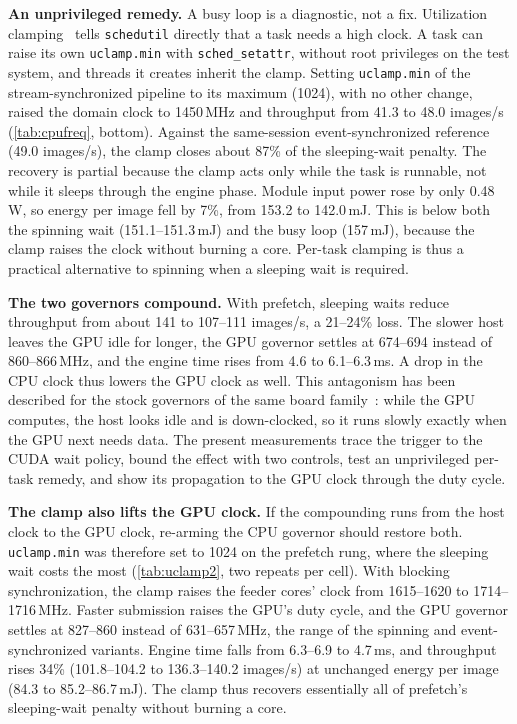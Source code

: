 

\textbf{An unprivileged remedy.}
A busy loop is a diagnostic, not a fix. Utilization
clamping~\cite{linux2024uclamp} tells \texttt{schedutil} directly that a
task needs a high clock. A task can raise its own \texttt{uclamp.min}
with \texttt{sched\_setattr}, without root privileges on the test
system, and threads it creates inherit the clamp. Setting
\texttt{uclamp.min} of the stream-synchronized pipeline to its maximum
(1024), with no other change, raised the domain clock to 1450\,MHz and
throughput from 41.3 to 48.0 images/s (\cref{tab:cpufreq}, bottom). Against
the same-session event-synchronized reference (49.0 images/s), the clamp
closes about 87\% of the sleeping-wait penalty. The recovery is partial
because the clamp acts only while the task is runnable, not while it
sleeps through the engine phase. Module input
power rose by only 0.48\,W, so energy per image fell by 7\%, from 153.2
to 142.0\,mJ. This is below both the spinning wait (151.1--151.3\,mJ)
and the busy loop (157\,mJ), because the clamp raises the clock without
burning a core. Per-task clamping is thus a practical alternative
to spinning when a sleeping wait is required.

\textbf{The two governors compound.}
With prefetch, sleeping waits reduce throughput from about 141 to
107--111 images/s, a 21--24\% loss. The slower host leaves the GPU idle
for longer, the GPU governor settles at 674--694 instead of
860--866\,MHz, and the engine time rises from 4.6 to 6.1--6.3\,ms. A
drop in the CPU clock thus lowers the GPU clock as well. This
antagonism has been described for the stock governors of the same board
family~\cite{zhang2026sparsedvfs}: while the GPU computes, the host
looks idle and is down-clocked, so it runs slowly exactly when the GPU
next needs data. The present measurements trace the trigger to the CUDA
wait policy, bound the effect with two controls, test an unprivileged
per-task remedy, and show its propagation to the GPU clock through the
duty cycle.

\textbf{The clamp also lifts the GPU clock.}
If the compounding runs from the host clock to the GPU clock,
re-arming the CPU governor should restore both. \texttt{uclamp.min} was
therefore set to 1024 on the prefetch rung, where the sleeping wait
costs the most (\cref{tab:uclamp2}, two repeats per cell). With
blocking synchronization, the clamp raises the feeder cores' clock from
1615--1620 to 1714--1716\,MHz. Faster submission raises the GPU's duty
cycle, and the GPU governor settles at 827--860 instead of
631--657\,MHz, the range of the spinning and event-synchronized
variants. Engine time falls from 6.3--6.9 to 4.7\,ms, and throughput
rises 34\% (101.8--104.2 to 136.3--140.2 images/s) at unchanged energy
per image (84.3 to 85.2--86.7\,mJ). The clamp thus recovers essentially
all of prefetch's sleeping-wait penalty without burning a core.


